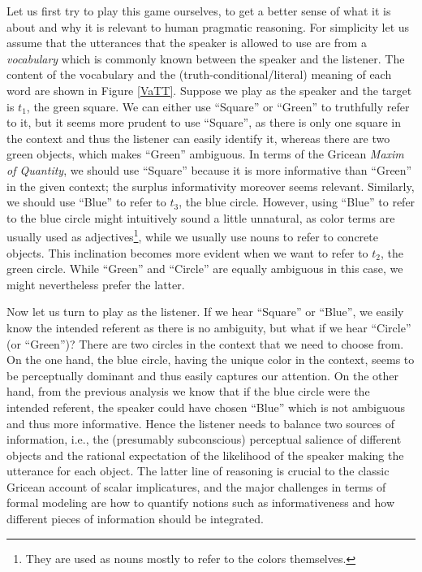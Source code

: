 Let us first try to play this game ourselves, to get a better sense of
what it is about and why it is relevant to human pragmatic
reasoning. For simplicity let us assume that the utterances that the
speaker is allowed to use are from a \emph{vocabulary} which is
commonly known between the speaker and the listener. The content of
the vocabulary and the (truth-conditional/literal) meaning of each
word are shown in Figure \ref{VaTT}. Suppose we play as the speaker
and the target is $t_1$, the green square. We can either use
``Square'' or ``Green'' to truthfully refer to it, but it seems more
prudent to use ``Square'', as there is only one square in the context
and thus the listener can easily identify it, whereas there are two
green objects, which makes ``Green'' ambiguous. In terms of the
Gricean \emph{Maxim of Quantity}, we should use ``Square'' because it
is more informative than ``Green'' in the given context; the surplus
informativity moreover seems relevant. Similarly, we should use
``Blue'' to refer to $t_3$, the blue circle. However, using ``Blue''
to refer to the blue circle might intuitively sound a little
unnatural, as color terms are usually used as adjectives\footnote{They
  are used as nouns mostly to refer to the colors themselves.}, while
we usually use nouns to refer to concrete objects. This inclination
becomes more evident when we want to refer to $t_2$, the green
circle. While ``Green'' and ``Circle'' are equally ambiguous in this
case, we might nevertheless prefer the latter.

Now let us turn to play as the listener. If we hear ``Square'' or
``Blue'', we easily know the intended referent as there is no
ambiguity, but what if we hear ``Circle'' (or ``Green'')? There are
two circles in the context that we need to choose from. On the one
hand, the blue circle, having the unique color in the context, seems
to be perceptually dominant and thus easily captures our attention. On
the other hand, from the previous analysis we know that if the blue
circle were the intended referent, the speaker could have chosen
``Blue'' which is not ambiguous and thus more informative. Hence the
listener needs to balance two sources of information, i.e., the
(presumably subconscious) perceptual salience of different objects and
the rational expectation of the likelihood of the speaker making the
utterance for each object. The latter line of reasoning is crucial to
the classic Gricean account of scalar implicatures, and the major
challenges in terms of formal modeling are how to quantify notions
such as informativeness and how different pieces of information should
be integrated.

